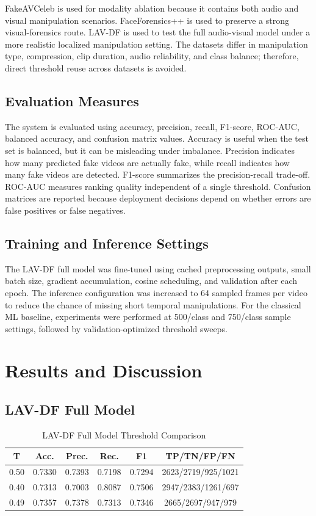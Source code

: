 \documentclass[conference]{IEEEtran}
\begin{document}
FakeAVCeleb is used for modality ablation because it contains both audio and visual manipulation scenarios. FaceForensics++ is used to preserve a strong visual-forensics route. LAV-DF is used to test the full audio-visual model under a more realistic localized manipulation setting. The datasets differ in manipulation type, compression, clip duration, audio reliability, and class balance; therefore, direct threshold reuse across datasets is avoided.

\subsection{Evaluation Measures}
The system is evaluated using accuracy, precision, recall, F1-score, ROC-AUC, balanced accuracy, and confusion matrix values. Accuracy is useful when the test set is balanced, but it can be misleading under imbalance. Precision indicates how many predicted fake videos are actually fake, while recall indicates how many fake videos are detected. F1-score summarizes the precision-recall trade-off. ROC-AUC measures ranking quality independent of a single threshold. Confusion matrices are reported because deployment decisions depend on whether errors are false positives or false negatives.

\subsection{Training and Inference Settings}
The LAV-DF full model was fine-tuned using cached preprocessing outputs, small batch size, gradient accumulation, cosine scheduling, and validation after each epoch. The inference configuration was increased to 64 sampled frames per video to reduce the chance of missing short temporal manipulations. For the classical ML baseline, experiments were performed at 500/class and 750/class sample settings, followed by validation-optimized threshold sweeps.

\section{Results and Discussion}
\subsection{LAV-DF Full Model}
\begin{table}[htbp]
\caption{LAV-DF Full Model Threshold Comparison}
\centering
\begin{tabular}{cccccc}
\toprule
T & Acc. & Prec. & Rec. & F1 & TP/TN/FP/FN \\
\midrule
0.50 & 0.7330 & 0.7393 & 0.7198 & 0.7294 & 2623/2719/925/1021 \\
0.40 & 0.7313 & 0.7003 & 0.8087 & 0.7506 & 2947/2383/1261/697 \\
0.49 & 0.7357 & 0.7378 & 0.7313 & 0.7346 & 2665/2697/947/979 \\
\bottomrule
\end{tabular}
\end{table}
\end{document}
